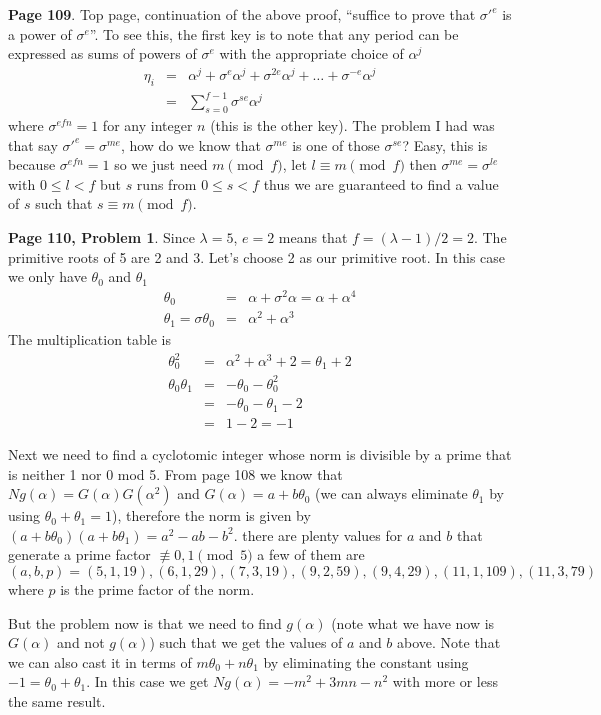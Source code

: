 \documentclass[aps,preprint,preprintnumbers,nofootinbib,showpacs,prd]{revtex4-1}
\newcommand{\nbea}{\begin{eqnarray*}}
\newcommand{\neea}{\end{eqnarray*}}
\begin{document}
{\bf Page 109}. Top page, continuation of the above proof, ``suffice to prove that $\sigma'^e$ is a power of $\sigma^e$''. To see this, the first key is to note that any period can be expressed as sums of powers of $\sigma^e$ with the appropriate choice of $\alpha^j$
%
\nbea
\eta_i & = & \alpha^j + \sigma^e \alpha^j + \sigma^{2e}\alpha^j + \dots + \sigma^{-e}\alpha^j \\
& = & \sum_{s = 0}^{f-1} \sigma^{se} \alpha^j
\neea
%
where $\sigma^{efn} = 1$ for any integer $n$ (this is the other key). The problem I had was that say $\sigma'^e = \sigma^{me}$, how do we know that $\sigma^{me}$ is one of those $\sigma^{se}$? Easy, this is because $\sigma^{efn} = 1$ so we just need $m \pmod{f}$, let $l \equiv m \pmod{f}$ then $\sigma^{me} = \sigma^{le}$ with $0 \le l < f$ but $s$ runs from $0 \le s < f$ thus we are guaranteed to find a value of $s$ such that $s \equiv m \pmod{f}$.


{\bf Page 110, Problem 1}. Since $\lambda = 5$, $e = 2$ means that $f = (\lambda-1)/2 = 2$. The primitive roots of 5 are 2 and 3. Let's choose 2 as our primitive root. In this case we only have $\theta_0$ and $\theta_1$
%
\nbea
\theta_0 & = & \alpha + \sigma^2 \alpha = \alpha + \alpha^4 \\
\theta_1 = \sigma \theta_0 & = & \alpha^2 + \alpha^3
\neea
%
The multiplication table is
%
\nbea
\theta^2_0 & = & \alpha^2 + \alpha^3 + 2 = \theta_1 + 2 \\
\theta_0 \theta_1 & = & -\theta_0 - \theta^2_0 \\
& = & - \theta_0 - \theta_1 - 2 \\
& = & 1 - 2 = -1
\neea
%

Next we need to find a cyclotomic integer whose norm is divisible by a prime that is neither 1 nor 0 mod 5. From page 108 we know that $Ng(\alpha) = G(\alpha)G(\alpha^2)$ and $G(\alpha) = a + b\theta_0$ (we can always eliminate $\theta_1$ by using $\theta_0 + \theta_1 = 1$), therefore the norm is given by $(a + b\theta_0)(a + b\theta_1) = a^2 - ab - b^2$. there are plenty values for $a$ and $b$ that generate a prime factor $\not\equiv 0,1 \pmod{5}$ a few of them are $(a,b, p) = (5,1,19),(6,1,29),(7,3, 19),(9,2,59),(9,4, 29),(11,1,109),(11,3, 79)$ where $p$ is the prime factor of the norm.

But the problem now is that we need to find $g(\alpha)$ (note what we have now is $G(\alpha)$ and not $g(\alpha)$) such that we get the values of $a$ and $b$ above. Note that we can also cast it in terms of $m\theta_0 + n\theta_1$ by eliminating the constant using $-1 = \theta_0 + \theta_1$. In this case we get $Ng(\alpha) = -m^2 + 3mn - n^2$ with more or less the same result.
\end{document}

